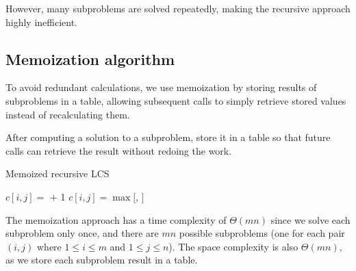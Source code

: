 However, many subproblems are solved repeatedly, making the recursive approach highly inefficient.

\subsection{Memoization algorithm}
To avoid redundant calculations, we use memoization by storing results of subproblems in a table, allowing subsequent calls to simply retrieve stored values instead of recalculating them.
\begin{definition} 
    After computing a solution to a subproblem, store it in a table so that future calls can retrieve the result without redoing the work. 
\end{definition}
\begin{algorithm}[H]
    \caption{Memoized recursive LCS}
    \begin{algorithmic}
                \State $c[i,j]=$  $+$ 1
            \Else 
                \State $c[i,j]=\max[$, $]$
            \EndIf 
        \EndIf
        \EndProcedure
    \end{algorithmic}
\end{algorithm}  
The memoization approach has a time complexity of $\Theta(mn)$ since we solve each subproblem only once, and there are $mn$ possible subproblems (one for each pair $(i,j)$ where $1\leq i \leq m$ and $1 \leq j \leq n$).
The space complexity is also $\Theta(mn)$, as we store each subproblem result in a table.

